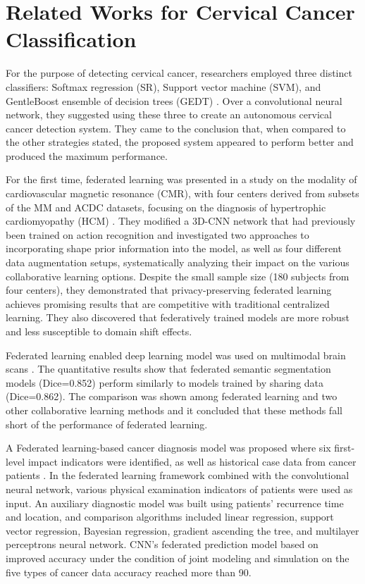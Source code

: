 \section{Related Works for Cervical Cancer Classification}

For the purpose of detecting cervical cancer, researchers employed three distinct classifiers: Softmax regression (SR), Support vector machine (SVM), and GentleBoost ensemble of decision trees (GEDT) \cite{ar4}. Over a convolutional neural network, they suggested using these three to create an autonomous cervical cancer detection system. They came to the conclusion that, when compared to the other strategies stated, the proposed system appeared to perform better and produced the maximum performance. 

For the first time, federated learning was presented in a study on the modality of cardiovascular magnetic resonance (CMR), with four centers derived from subsets of the MM and ACDC datasets, focusing on the diagnosis of hypertrophic cardiomyopathy (HCM) \cite{ar5}. They modified a 3D-CNN network that had previously been trained on action recognition and investigated two approaches to incorporating shape prior information into the model, as well as four different data augmentation setups, systematically analyzing their impact on the various collaborative learning options. Despite the small sample size (180 subjects from four centers), they demonstrated that privacy-preserving federated learning achieves promising results that are competitive with traditional centralized learning. They also discovered that federatively trained models are more robust and less susceptible to domain shift effects. 

Federated learning enabled deep learning model was used on multimodal brain scans \cite{ar6}. The quantitative results show that federated semantic segmentation models (Dice=0.852) perform similarly to models trained by sharing data (Dice=0.862). The comparison was shown among federated learning and two other collaborative learning methods and it concluded that these methods fall short of the performance of federated learning. 

 A Federated learning-based cancer diagnosis model was proposed where six first-level impact indicators were identified, as well as historical case data from cancer patients \cite{ar7}. In the federated learning framework combined with the convolutional neural network, various physical examination indicators of patients were used as input. An auxiliary diagnostic model was built using patients’ recurrence time and location, and comparison algorithms included linear regression, support vector regression, Bayesian regression, gradient ascending the tree, and multilayer perceptrons neural network. CNN’s federated prediction model based on improved accuracy under the condition of joint modeling and simulation on the five types of cancer data accuracy reached more than 90. 

